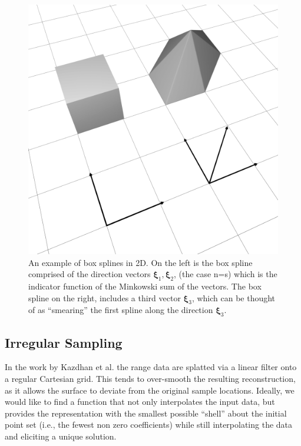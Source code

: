 \begin{figure}
  \centering
  \mbox{} \hfill
	\includegraphics[width=\linewidth]{figures/boxspline/2dex}
  \caption{\label{fig:box2d}%
  An example of box splines in 2D. On the left is the box spline comprised of the direction vectors $\mathbf{\xi}_1, \mathbf{\xi}_2$, (the case n=s) which is the indicator function of the Minkowski sum of the vectors. The box spline on the right, includes a third vector $\mathbf{\xi}_3$, which can be thought of as ``smearing'' the first spline along the direction $\mathbf{\xi}_3$.
  }
\end{figure}


\subsection{Irregular Sampling}
\label{sec:vari_review}
In the work by Kazdhan et al. \cite{fftk} the range data are splatted via a linear filter onto a regular Cartesian grid. This tends to over-smooth the resulting reconstruction, as it allows the surface to deviate from the original sample locations. Ideally, we would like to find a function that not only interpolates the input data, but provides the representation with the smallest possible ``shell'' about the initial point set (i.e., the fewest non zero coefficients) while still interpolating the data and eliciting a unique solution. 

